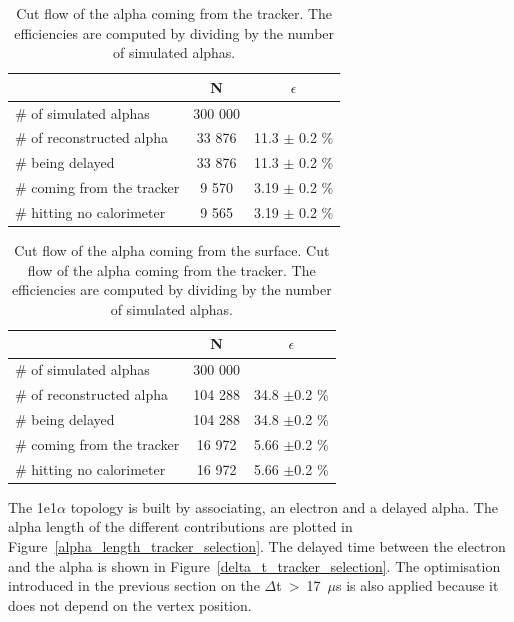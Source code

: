 \documentclass[main.tex]{subfiles}
\begin{document}
\begin{table}[h!]
\begin{center}
\begin{tabular}{l|c|c}
 & N & $\epsilon$ \\
\toprule
$\#$ of simulated alphas & 300 000 & \\
\hline
$\#$ of reconstructed alpha & 33 876 & 11.3 $\pm$ 0.2 \%\\
$\#$ being delayed          & 33 876 & 11.3 $\pm$ 0.2 \%\\
$\#$ coming from the tracker& 9 570  & 3.19 $\pm$ 0.2 \%\\
$\#$ hitting no calorimeter & 9 565  & 3.19 $\pm$ 0.2 \%\\
\bottomrule
\end{tabular}
\end{center}
\caption{Cut flow of the alpha coming from the tracker. The efficiencies are computed by dividing by the number of simulated alphas.}
\label{Cutflowalphatrackerbulk}
\end{table}


\begin{table}[h!]
\begin{center}
\begin{tabular}{l|c|c}
 & N & $\epsilon$ \\
\toprule
$\#$ of simulated alphas & 300 000 & \\
\hline
$\#$ of reconstructed alpha & 104 288 & 34.8 $\pm $0.2 \%\\
$\#$ being delayed          & 104 288 & 34.8 $\pm $0.2 \%\\
$\#$ coming from the tracker& 16 972  & 5.66 $\pm $0.2 \%\\
$\#$ hitting no calorimeter & 16 972  & 5.66 $\pm $0.2 \%\\
\bottomrule
\end{tabular}
\end{center}
\caption{Cut flow of the alpha coming from the surface. Cut flow of the alpha coming from the tracker. The efficiencies are computed by dividing by the number of simulated alphas.}
\label{Cutflowalphatrackersurface}
\end{table}


\bigskip


\noindent The 1e1$\alpha$ topology is built by associating, an electron and a delayed alpha. The alpha length of the different contributions are plotted in Figure~\ref{alpha_length_tracker_selection}. The delayed time between the electron and the alpha is shown in Figure~\ref{delta_t_tracker_selection}. The optimisation introduced in the previous section on the $\Delta$t~>~17~$\mu$s is also applied because it does not depend on the vertex position. 
\end{document}
